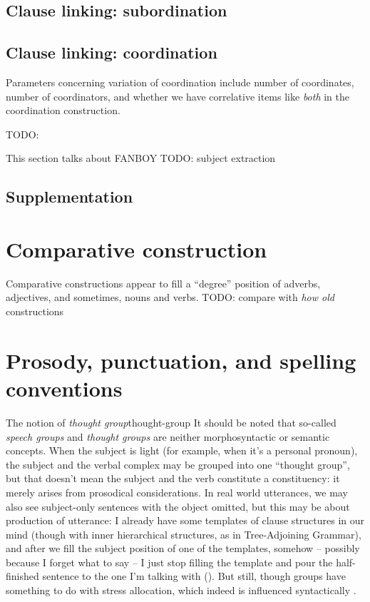 \documentclass[UTF8, a4paper, oneside, scheme=plain]{ctexrep}
\newcommand*{\citepage}[1]{p.~{#1}}
\newcommand*{\term}[1]{\emph{#1}}
\newcommand{\corpus}[1]{\emph{#1}}
\begin{document}
\section{Clause linking: subordination}\label{sec:clause-linking.subordination}



\section{Clause linking: coordination}\label{sec:clause-linking.coordination}

Parameters concerning variation of coordination 
include number of coordinates, 
number of coordinators,
and whether we have correlative items like \corpus{both} in the coordination construction.

TODO: \citet[\citepage{1276}]{cgel}

This section talks about FANBOY
TODO: subject extraction

\section{Supplementation}\label{sec:clause-linking.supplementation}

\chapter{Comparative construction}

Comparative constructions appear to fill a ``degree'' position
of adverbs, adjectives, and sometimes, nouns and verbs.
TODO: compare with \corpus{how old} constructions  

\chapter{Prosody, punctuation, and spelling conventions}

\begin{infobox}{The notion of \term{thought group}}{thought-group}
    It should be noted that so-called \term{speech groups}
    and \term{thought groups}
    are neither morphosyntactic or semantic concepts.
    When the subject is light (for example, when it's a personal pronoun),
    the subject and the verbal complex may be grouped into one ``thought group'',
    but that doesn't mean the subject and the verb constitute a constituency:
    it merely arises from prosodical considerations.
    In real world utterances, 
    we may also see subject-only sentences with the object omitted,
    but this may be about production of utterance:
    I already have some templates of clause structures in our mind
    (though with inner hierarchical structures, as in Tree-Adjoining Grammar),
    and after we fill the subject position of one of the templates,
    somehow -- possibly because I forget what to say -- 
    I just stop filling the template and pour the half-finished sentence 
    to the one I'm talking with
    ().
    But still, though groups have something to do with stress allocation,
    which indeed is influenced syntactically \citep[\citepage{7}]{kahnemuyipour2009syntax}. 
\end{infobox}
\end{document}

